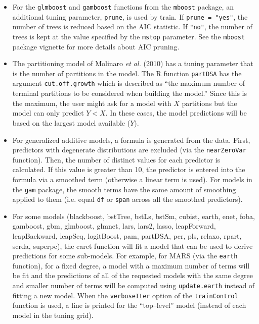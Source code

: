 \documentclass[12pt]{article}
\newcommand{\code}[1]{\mbox{\footnotesize\color{darkblue}\texttt{#1}}}
\newcommand{\pkg}[1]{{\fontseries{b}\selectfont #1}}
\renewcommand{\pkg}[1]{{\textsf{#1}}}
\begin{document}
\begin{itemize}
\item For the \code{glmboost} and \code{gamboost} functions
  from the \texttt{mboost} package, an additional tuning parameter,
  \code{prune}, is used by train. If \code{prune = "yes"}, the
  number of trees is reduced based on the AIC statistic. If
  \code{"no"}, the number of trees is kept at the value specified
  by the \code{mstop} parameter. See the \texttt{mboost} package
  vignette for more details about AIC pruning. 
  
\item The partitioning model of Molinaro {\it et al.} (2010) has a
  tuning parameter that is the number of partitions in the
  model. The R function \code{partDSA} has the argument
  \code{cut.off.growth} which is described as ``the maximum number
  of terminal partitions to be considered when building the model.''
  Since this is the maximum, the user might ask for a model with $X$
  partitions but the model can only predict $Y < X$. In these cases,
  the model predictions will be based on the largest model available
  ($Y$). 

    \item For generalized additive models, a formula is generated from
      the data. First, predictors with degenerate distributions are
      excluded (via the \code{nearZeroVar} function). Then, the
      number of distinct values for each predictor is calculated. If
      this value is greater than 10, the predictor is entered into the
      formula via a smoothed term (otherwise a linear term is
      used). For models in the \texttt{gam} package, the smooth terms
      have the same amount of smoothing applied to them (i.e. equal
      \code{df} or \code{span} across all the smoothed predictors).
      
    \item For some models (\pkg{blackboost}, \pkg{bstTree}, \pkg{bstLs}, \pkg{bstSm}, \pkg{cubist}, \pkg{earth}, \pkg{enet}, \pkg{foba}, \pkg{gamboost}, \pkg{gbm}, \pkg{glmboost}, \pkg{glmnet}, \pkg{lars}, \pkg{lars2}, \pkg{lasso}, \pkg{leapForward}, \pkg{leapBackward}, \pkg{leapSeq}, \pkg{logitBoost}, \pkg{pam}, \pkg{partDSA}, \pkg{pcr}, \pkg{pls}, \pkg{relaxo}, \pkg{rpart}, \pkg{scrda}, \pkg{superpc}), the \pkg{caret}
      function will fit a model that can be used to derive predictions
      for some sub-models. For example, for MARS (via the
      \code{earth} function), for a fixed degree, a model with a
      maximum number of terms will be fit and the predictions of all of
      the requested models with the same degree and smaller number of
      terms will be computed using \code{update.earth} instead of
      fitting a new model. When the \code{verboseIter} option of the
      \code{trainControl} function is
      used, a line is printed for the ``top--level'' model (instead of
      each model in the tuning grid). 


\end{itemize}
\end{document}
